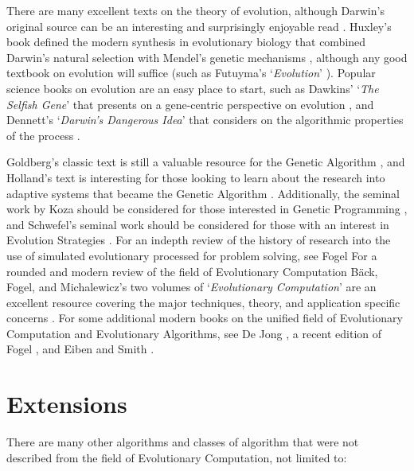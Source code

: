 \begin{bibunit}
There are many excellent texts on the theory of evolution, although Darwin's original source can be an interesting and surprisingly enjoyable read \cite{Darwin1859}. Huxley's book defined the modern synthesis in evolutionary biology that combined Darwin's natural selection with Mendel's genetic mechanisms \cite{Huxley1942}, although any good textbook on evolution will suffice (such as Futuyma's `\emph{Evolution}' \cite{Futuyma2009}). Popular science books on evolution are an easy place to start, such as Dawkins' `\emph{The Selfish Gene}' that presents on a gene-centric perspective on evolution \cite{Dawkins1976}, and Dennett's `\emph{Darwin's Dangerous Idea}' that considers on the algorithmic properties of the process \cite{Dennett1995}.

Goldberg's classic text is still a valuable resource for the Genetic Algorithm \cite{Goldberg1989}, and Holland's text is interesting for those looking to learn about the research into adaptive systems that became the Genetic Algorithm \cite{Holland1975}. Additionally, the seminal work by Koza should be considered for those interested in Genetic Programming \cite{Koza1992}, and Schwefel's seminal work should be considered for those with an interest in Evolution Strategies \cite{Schwefel1981}. For an indepth review of the history of research into the use of simulated evolutionary processed for problem solving, see Fogel \cite{Fogel1998}
For a rounded and modern review of the field of Evolutionary Computation B\"ack, Fogel, and Michalewicz's two volumes of `\emph{Evolutionary Computation}' are an excellent resource covering the major techniques, theory, and application specific concerns \cite{Baeck2000, Baeck2000a}.
For some additional modern books on the unified field of Evolutionary Computation and Evolutionary Algorithms, see De Jong \cite{Jong2006}, a recent edition of Fogel \cite{Fogel1995}, and Eiben and Smith \cite{Eiben2003}.

% 
% 
\section{Extensions}
There are many other algorithms and classes of algorithm that were not described from the field of Evolutionary Computation, not limited to:


\end{bibunit}
